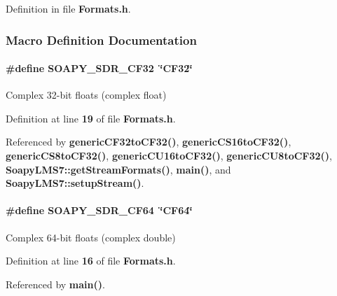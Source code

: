 Definition in file {\bf Formats.\+h}.



\subsubsection{Macro Definition Documentation}
\paragraph[{S\+O\+A\+P\+Y\+\_\+\+S\+D\+R\+\_\+\+C\+F32}]{\setlength{\rightskip}{0pt plus 5cm}\#define S\+O\+A\+P\+Y\+\_\+\+S\+D\+R\+\_\+\+C\+F32~\char`\"{}C\+F32\char`\"{}}\label{Formats_8h_abebddab9f01fc2784a9a83e451b3f216}


Complex 32-\/bit floats (complex float) 



Definition at line {\bf 19} of file {\bf Formats.\+h}.



Referenced by {\bf generic\+C\+F32to\+C\+F32()}, {\bf generic\+C\+S16to\+C\+F32()}, {\bf generic\+C\+S8to\+C\+F32()}, {\bf generic\+C\+U16to\+C\+F32()}, {\bf generic\+C\+U8to\+C\+F32()}, {\bf Soapy\+L\+M\+S7\+::get\+Stream\+Formats()}, {\bf main()}, and {\bf Soapy\+L\+M\+S7\+::setup\+Stream()}.

\paragraph[{S\+O\+A\+P\+Y\+\_\+\+S\+D\+R\+\_\+\+C\+F64}]{\setlength{\rightskip}{0pt plus 5cm}\#define S\+O\+A\+P\+Y\+\_\+\+S\+D\+R\+\_\+\+C\+F64~\char`\"{}C\+F64\char`\"{}}\label{Formats_8h_abc42d399be379e67981f03a0223b1b60}


Complex 64-\/bit floats (complex double) 



Definition at line {\bf 16} of file {\bf Formats.\+h}.



Referenced by {\bf main()}.

